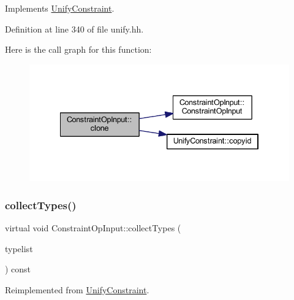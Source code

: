 Implements \mbox{\hyperlink{class_unify_constraint_a4f068343932637d355644bb21559aa12}{Unify\+Constraint}}.



Definition at line 340 of file unify.\+hh.

Here is the call graph for this function\+:
\nopagebreak
\begin{figure}[H]
\begin{center}
\leavevmode
\includegraphics[width=334pt]{class_constraint_op_input_a59e0a95fa29163053aaf79e29697fd3c_cgraph}
\end{center}
\end{figure}
\mbox{\label{class_constraint_op_input_a0f9b4168eddd0b1933a275bb1f67d7e1}} 
\subsubsection{\texorpdfstring{collectTypes()}{collectTypes()}}
{\footnotesize\ttfamily virtual void Constraint\+Op\+Input\+::collect\+Types (\begin{DoxyParamCaption}\item[{vector$<$ \mbox{\hyperlink{class_unify_datatype}{Unify\+Datatype}} $>$ \&}]{typelist }\end{DoxyParamCaption}) const\hspace{0.3cm}{\ttfamily [virtual]}}



Reimplemented from \mbox{\hyperlink{class_unify_constraint_acb83b6bea3b21e13054e72ac9cfaba0f}{Unify\+Constraint}}.

\mbox{\label{class_constraint_op_input_a78092a6de093b9f0843eab77043fe5be}} 
